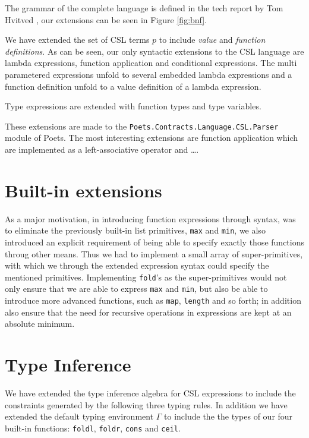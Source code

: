 \documentclass[10pt,a4paper,final,oneside,openany,article]{memoir}
\begin{document}
The grammar of the complete language is defined in the tech report by
Tom Hvitved \cite[p. 13]{hvitved10}, our extensions can be seen in
Figure \ref{fig:bnf}. 

We have extended the set of CSL terms $p$ to include \textit{value}
and \textit{function definitions}.  As can be seen, our only syntactic
extensions to the CSL language are lambda expressions, function
application and conditional expressions. The multi parametered
expressions unfold to several embedded lambda expressions and a
function definition unfold to a value definition of a lambda
expression.

Type expressions are extended with function types and type
variables.

These extensions are made to the
\texttt{Poets.Contracts.Language.CSL.Parser} module of Poets. The most
interesting extensions are function application which are implemented
as a left-associative operator and \ldots.  


\section{Built-in extensions}
As a major motivation, in introducing function expressions through
syntax, was to eliminate the previously built-in list primitives,
\lstinline{max} and \lstinline{min}, we also introduced an explicit
requirement of being able to specify exactly those functions throug
other means. Thus we had to implement a small array of super-primitives,
with which we through the extended expression syntax could specify the
mentioned primitives. Implementing \lstinline{fold}'s as the
super-primitives would not only ensure that we are able to express 
\lstinline{max} and \lstinline{min}, but also be able to introduce more
advanced functions, such as \lstinline{map}, \lstinline{length} and so 
forth; in addition also ensure that the need for recursive operations
in expressions are kept at an absolute minimum.

\section{Type Inference}
We have extended the type inference algebra for CSL expressions to
include the constraints generated by the following three typing rules.
In addition we have extended the default typing environment $\Gamma$
to include the the types of our four built-in functions:
\lstinline{foldl}, \lstinline{foldr}, \lstinline{cons} and
\lstinline{ceil}.
\end{document}
